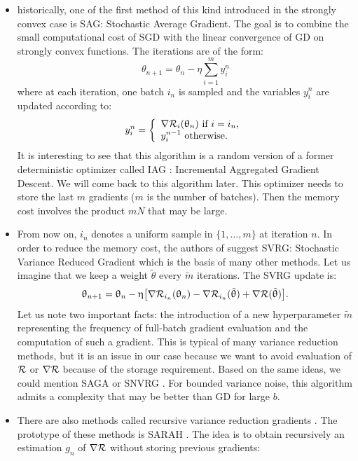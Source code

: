 \documentclass[article,authoryear,jmlmc]{beg_32}             %
\begin{document}
\begin{itemize}
	\item historically, one of the first method of this kind introduced in the strongly convex case is SAG: Stochastic Average Gradient. The goal is to combine the small computational cost of SGD with the linear convergence of GD on strongly convex functions. The iterations are of the form:
	\begin{equation*}
		\theta_{n+1}=\theta_n-\eta \sum_{i=1}^m y_i^n
	\end{equation*}
	where at each iteration, one batch $i_n$ is sampled and the variables $y_i^n$ are updated according to:
	\begin{equation*}
		y_i^n =
		\left\{
		\begin{array}{ll}
			\nR_i(\theta_n) \text{ if } i=i_n, \\
			y_i^{n-1} \text{ otherwise}.
		\end{array}
		\right.
	\end{equation*}
It is interesting to see that this algorithm is a random version of a former deterministic optimizer called IAG \cite{IAG_first}: Incremental Aggregated Gradient Descent. We will come back to this algorithm later. This optimizer needs to store the last $m$ gradients ($m$ is the number of batches). Then the memory cost involves the product $mN$ that may be large.
\item From now on, $i_n$ denotes a uniform sample in $\{1,\dots,m\}$ at iteration $n$. In order to reduce the memory cost, the authors of \cite{SVRG_first} suggest SVRG: Stochastic Variance Reduced Gradient which is the basis of many other methods. Let us imagine that we keep a weight $\tilde{\theta}$ every $\tilde{m}$ iterations. The SVRG update is:
\begin{equation*}
	\theta_{n+1} = \theta_n -\eta \left[\nR_{i_n}(\theta_n)-\nR_{i_n}(\tilde{\theta})+\nR(\tilde{\theta})\right].
\end{equation*}
    Let us note two important facts: the introduction of a new hyperparameter $\tilde{m}$ representing the frequency of full-batch gradient evaluation and the computation of such a
    gradient. This is typical of many variance reduction methods, but it is an issue in our case because we want to avoid evaluation of $\mathcal{R}$ or $\nabla \mathcal{R}$ because of the storage
    requirement. Based on the same ideas, we could mention SAGA \cite{SAGA_first} or SNVRG \cite{SNVRG_first}. For bounded variance noise, this algorithm admits a complexity that
    may be better than GD for large $b$. 
\item There are also methods called recursive variance reduction gradients . The prototype of these methods is SARAH \cite{SARAH_first}. The idea is to obtain recursively an estimation $g_n$ of $\nabla \mathcal{R}$ without storing previous gradients:

\end{itemize}
\end{document}
